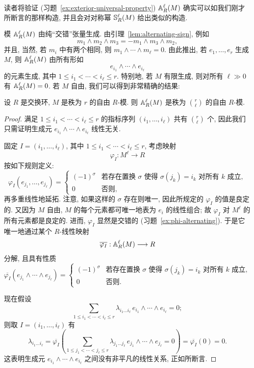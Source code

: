 读者将验证 (习题~\ref{ex:exterior-universal-property}) $\mathbb{A}_R^\ell(M)$ 确实可以如我们刚才所断言的那样构造, 并且会对对称幂 $\mathbb{S}_R^\ell(M)$ 给出类似的构造.

模 $\mathbb{A}_R^\ell(M)$ 由纯``交错''张量生成. 由引理~\ref{lem:alternating-sign}, 例如
\[
m_1\wedge m_2\wedge m_3=-m_1\wedge m_3\wedge m_2,
\]
并且, 当然, 若 $m_i$ 中有两个相同, 则 $m_1\wedge\cdots\wedge m_\ell=0$. 由此推出, 若 $e_1,\dots,e_r$ 生成 $M$, 则 $\mathbb{A}_R^\ell(M)$ 由所有形如
\[
e_{i_1}\wedge\cdots\wedge e_{i_\ell}
\]
的元素生成, 其中 $1\le i_1<\cdots<i_\ell\le r$. 特别地, 若 $M$ 有限生成, 则对所有 $\ell\gg0$ 有 $\mathbb{A}_R^\ell(M)=0$. 若 $M$ 自由, 我们可以得到非常精确的结果:

\begin{lemma}\label{lem:exterior-free-rank}
设 $R$ 是交换环, $M$ 是秩为 $r$ 的自由 $R$-模. 则 $\mathbb{A}_R^\ell(M)$ 是秩为 $\binom{r}{\ell}$ 的自由 $R$-模.
\end{lemma}

\begin{proof}
满足 $1\le i_1<\cdots<i_\ell\le r$ 的指标序列 $(i_1,\dots,i_\ell)$ 共有 $\binom{r}{\ell}$ 个, 因此我们只需证明生成元 $e_{i_1}\wedge\cdots\wedge e_{i_\ell}$ 线性无关.

固定 $I=(i_1,\dots,i_\ell)$, 其中 $1\le i_1<\cdots<i_\ell\le r$, 考虑映射
\[
\varphi_I:M^\ell\longrightarrow R
\]
按如下规则定义:
\[
\varphi_I(e_{j_1},\dots,e_{j_\ell})=
\begin{cases}
(-1)^\sigma & \text{若存在置换 }\sigma\text{ 使得 }\sigma(j_k)=i_k\text{ 对所有 }k\text{ 成立},\\
0 & \text{否则},
\end{cases}
\]
再多重线性地延拓. 注意, 如果这样的 $\sigma$ 存在则唯一, 因此所规定的 $\varphi_I$ 的值是良定的. 又因为 $M$ 自由, $M$ 的每个元素都可唯一地表为 $e_i$ 的线性组合; 故 $\varphi_I$ 对 $M^\ell$ 的所有元素都是良定的. 进而, $\varphi_I$ 显然是交错的 (习题~\ref{ex:phi-alternating}). 于是它唯一地通过某个 $R$-线性映射
\[
\overline{\varphi_I}:\mathbb{A}_R^\ell(M)\longrightarrow R
\]
分解, 且具有性质
\[
\overline{\varphi_I}(e_{j_1}\wedge\cdots\wedge e_{j_\ell})=
\begin{cases}
(-1)^\sigma & \text{若存在置换 }\sigma\text{ 使得 }\sigma(j_k)=i_k\text{ 对所有 }k\text{ 成立},\\
0 & \text{否则}.
\end{cases}
\]

现在假设
\[
\sum_{1\le i_1<\cdots<i_\ell\le r}\lambda_{i_1\dots i_\ell}\,e_{i_1}\wedge\cdots\wedge e_{i_\ell}=0;
\]
则取 $I=(i_1,\dots,i_\ell)$ 有
\[
\lambda_{i_1\dots i_\ell}=\overline{\varphi_I}\left(\sum_{1\le j_1<\cdots<j_\ell\le r}\lambda_{j_1\dots j_\ell}\,e_{j_1}\wedge\cdots\wedge e_{j_\ell}=0\right)=\overline{\varphi_I}(0)=0.
\]
这表明生成元 $e_{i_1}\wedge\cdots\wedge e_{i_\ell}$ 之间没有非平凡的线性关系, 正如所断言.
\end{proof}

